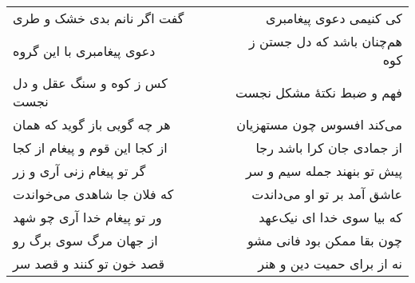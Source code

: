 \begin{center}
\begin{longtable}{l p{0.5cm} r}
گفت اگر نانم بدی خشک و طری
&&
کی کنیمی دعوی پیغامبری
\\
دعوی پیغامبری با این گروه
&&
هم‌چنان باشد که دل جستن ز کوه
\\
کس ز کوه و سنگ عقل و دل نجست
&&
فهم و ضبط نکتهٔ مشکل نجست
\\
هر چه گویی باز گوید که همان
&&
می‌کند افسوس چون مستهزیان
\\
از کجا این قوم و پیغام از کجا
&&
از جمادی جان کرا باشد رجا
\\
گر تو پیغام زنی آری و زر
&&
پیش تو بنهند جمله سیم و سر
\\
که فلان جا شاهدی می‌خواندت
&&
عاشق آمد بر تو او می‌داندت
\\
ور تو پیغام خدا آری چو شهد
&&
که بیا سوی خدا ای نیک‌عهد
\\
از جهان مرگ سوی برگ رو
&&
چون بقا ممکن بود فانی مشو
\\
قصد خون تو کنند و قصد سر
&&
نه از برای حمیت دین و هنر
\\
\end{longtable}
\end{center}
